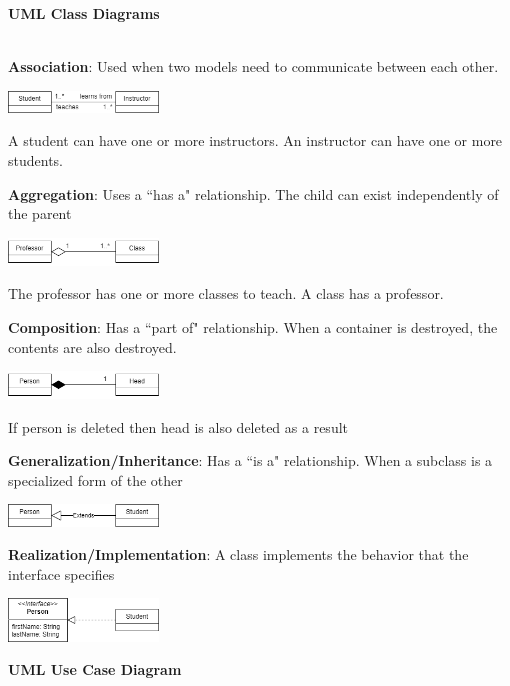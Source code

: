 \documentclass[8pt, letterpaper, titlepage]{article}
\begin{document}
\begin{multicols*}{3}
\textbf{UML Class Diagrams}

 \\
\textbf{Association}: Used when two models need to communicate between each other.
\begin{center}
    \includegraphics[width=4cm]{uni.png}
\end{center}
A student can have one or more instructors. An instructor can have one or more students.

\textbf{Aggregation}:  Uses a ``has a" relationship. The child can exist independently of the parent
\begin{center}
\includegraphics[width=4cm]{aggregation.png}
\end{center}
The professor has one or more classes to teach. A class has a professor.

\textbf{Composition}: Has a ``part of" relationship. When a container is destroyed, the contents are also destroyed.
\begin{center}
    \includegraphics[width=4cm]{composition.png}
\end{center}
If person is deleted then head is also deleted as a result

\textbf{Generalization/Inheritance}: Has a ``is a" relationship. When a subclass is a specialized form of the other
\begin{center}
    \includegraphics[width=4cm]{Generalization.png}
\end{center}

\textbf{Realization/Implementation}: A class implements the behavior that the interface specifies
\begin{center}
    \includegraphics[width=4cm]{interface.png}
\end{center}
\vfill\null
\columnbreak
\textbf{UML Use Case Diagram}


\end{multicols*}
\end{document}
